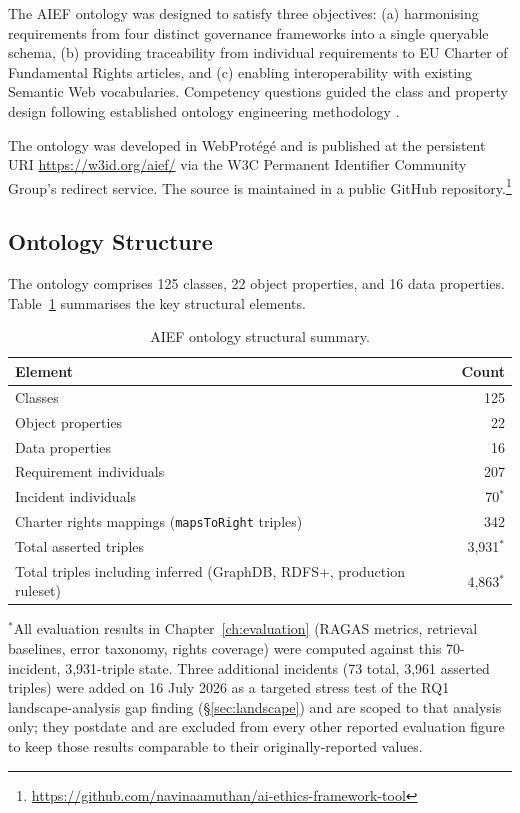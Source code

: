 The AIEF ontology was designed to satisfy three objectives: (a) harmonising requirements from four distinct governance frameworks into a single queryable schema, (b) providing traceability from individual requirements to EU Charter of Fundamental Rights articles, and (c) enabling interoperability with existing Semantic Web vocabularies. Competency questions guided the class and property design following established ontology engineering methodology \cite{gruninger1995}.

The ontology was developed in WebProt\'{e}g\'{e} and is published at the persistent URI \url{https://w3id.org/aief/} via the W3C Permanent Identifier Community Group's redirect service. The source is maintained in a public GitHub repository.\footnote{\url{https://github.com/navinaamuthan/ai-ethics-framework-tool}}


\subsection{Ontology Structure}

The ontology comprises 125 classes, 22 object properties, and 16 data properties. Table~\ref{tab:ontology_summary} summarises the key structural elements.

\begin{table}[htbp]
\centering
\caption{AIEF ontology structural summary.}
\label{tab:ontology_summary}
\begin{tabular}{lr}
\toprule
\textbf{Element} & \textbf{Count} \\
\midrule
Classes & 125 \\
Object properties & 22 \\
Data properties & 16 \\
Requirement individuals & 207 \\
Incident individuals & 70$^{*}$ \\
Charter rights mappings (\texttt{mapsToRight} triples) & 342 \\
Total asserted triples & 3,931$^{*}$ \\
Total triples including inferred (GraphDB, RDFS+, production ruleset) & 4,863$^{*}$ \\
\bottomrule
\end{tabular}

\vspace{2mm}
\footnotesize $^{*}$All evaluation results in Chapter~\ref{ch:evaluation} (RAGAS metrics, retrieval baselines, error taxonomy, rights coverage) were computed against this 70-incident, 3,931-triple state. Three additional incidents (73 total, 3,961 asserted triples) were added on 16 July 2026 as a targeted stress test of the RQ1 landscape-analysis gap finding (\S\ref{sec:landscape}) and are scoped to that analysis only; they postdate and are excluded from every other reported evaluation figure to keep those results comparable to their originally-reported values.
\end{table}

